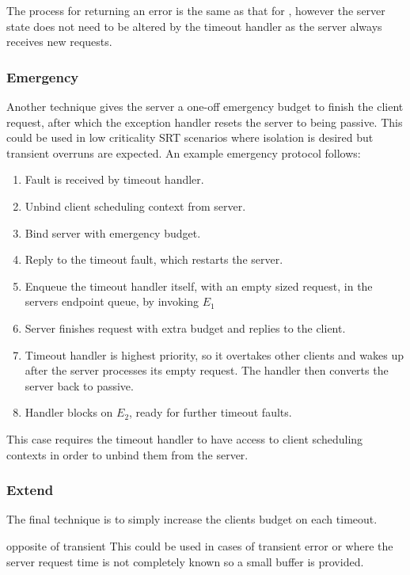 The process for returning an error is the same as that for , however the server
state does not need to be altered by the timeout handler as the server always receives new requests.

\subsubsection{Emergency}

Another technique gives the server a one-off emergency budget to finish the client request, after
which the exception handler resets the server to being passive. This could be used in low
criticality \gls{SRT}
scenarios where isolation is desired but transient overruns are expected.
An example emergency protocol follows:

\begin{enumerate}\label{e:rollback}
    \item Fault is received by timeout handler.
    \item Unbind client scheduling context from server.
    \item Bind server with emergency budget.
    \item Reply to the timeout fault, which restarts the server.
    \item Enqueue the timeout handler itself, with an empty sized request, in the servers
          endpoint queue, by invoking $E_{1}$
    \item Server finishes request with extra budget and replies to the client.
    \item Timeout handler is highest priority, so it overtakes other clients and wakes up after the 
          server processes its empty request. The handler then converts the server back to passive.
    \item Handler blocks on $E_{2}$, ready for further timeout faults.
\end{enumerate}

This case requires the timeout handler to have access to client scheduling contexts in order to
unbind them from the server. 

\subsubsection{Extend}

The final technique is to simply increase the clients budget on each timeout. 

opposite of transient
This could be used in
cases of transient error or where the server request time is not completely known so a small buffer
is provided.

